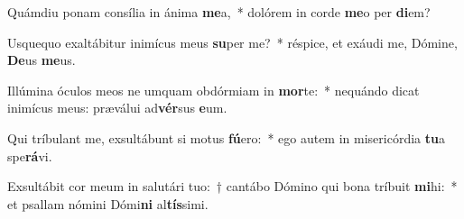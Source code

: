 \item Quámdiu ponam consília in ánima \textbf{me}a,~* dolórem in corde \textbf{me}o per \textbf{di}em?
\item Usquequo exaltábitur inimícus meus \textbf{su}per me?~* réspice, et exáudi me, Dómine, \textbf{De}us \textbf{me}us.
\item Illúmina óculos meos ne umquam obdórmiam in \textbf{mor}te:~* nequándo dicat inimícus meus: præválui ad\textbf{vér}sus \textbf{e}um.
\item Qui tríbulant me, exsultábunt si motus \textbf{fú}ero:~* ego autem in misericórdia \textbf{tu}a spe\textbf{rá}vi.
\item Exsultábit cor meum in salutári tuo:~† cantábo Dómino qui bona tríbuit \textbf{mi}hi:~* et psallam nómini Dómi\textbf{ni} al\textbf{tís}simi.

